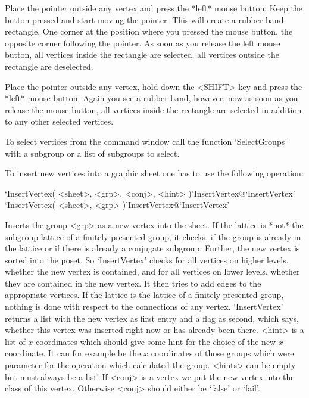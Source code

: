 Place the pointer  outside any vertex  and press the *left* mouse button.
Keep the button pressed and start moving the pointer.  This will create a
rubber band rectangle.  One corner at the position  where you pressed the
mouse button, the opposite corner following  the pointer.  As soon as you
release the left mouse button,   all  vertices inside the rectangle   are
selected, all vertices outside the rectangle are deselected.

Place the pointer outside any vertex, hold down the <SHIFT> key and press
the *left*  mouse button.  Again  you see a rubber  band, however, now as
soon as you release  the mouse button,  all vertices inside the rectangle
are selected in addition to any other selected vertices.

To select vertices from the {\GAP} command window call the function
`SelectGroups' with a subgroup or a list of subgroups to select.



To insert new vertices into a graphic sheet one has to use the
following operation:

\>`InsertVertex( <sheet>, <grp>, <conj>, <hint> )'{InsertVertex}@{`InsertVertex'} 
\>`InsertVertex( <sheet>, <grp> )'{InsertVertex}@{`InsertVertex'} 

Inserts the group <grp> as a new vertex into the sheet. If the lattice
is *not*  the   subgroup lattice  of a  finitely  presented  group, it
checks, if the group is already in the lattice  or if there is already
a conjugate  subgroup.  Further,  the new  vertex is  sorted into  the
poset. So  `InsertVertex'  checks for  all vertices  on higher levels,
whether the new vertex  is contained,  and  for all vertices on  lower
levels, whether they are contained in the new vertex. It then tries to
add edges to the appropriate vertices.  If  the lattice is the lattice
of a  finitely presented group,  nothing is  done with respect  to the
connections of any vertex.  `InsertVertex' returns a list with the new
vertex as first entry and  a flag as  second, which says, whether this
vertex was inserted right now or has already  been there.  <hint> is a
list of $x$ coordinates which should give  some hint for the choice of
the new $x$  coordinate. It can for example  be the $x$ coordinates of
those groups which  were parameter for  the operation which calculated
the group. <hints> can be empty but must always be  a list!  If <conj>
is a vertex we  put  the new vertex  into the  class  of this vertex.  
Otherwise <conj> should either be `false' or `fail'.


